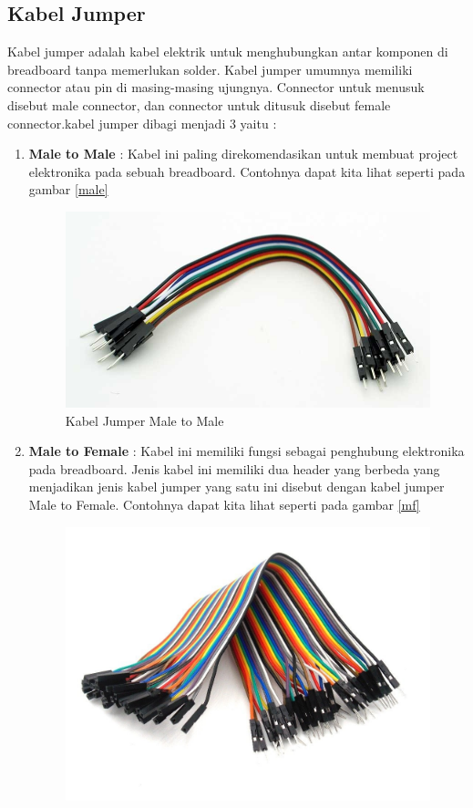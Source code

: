 \subsection{Kabel Jumper}
Kabel jumper adalah kabel elektrik untuk menghubungkan antar komponen di breadboard tanpa memerlukan solder. Kabel jumper umumnya memiliki connector atau pin di masing-masing ujungnya. Connector untuk menusuk disebut male connector, dan connector untuk ditusuk disebut female connector.kabel jumper dibagi menjadi 3 yaitu :
\begin{enumerate}
\item \textbf{Male to Male} : Kabel ini paling direkomendasikan untuk membuat project elektronika pada sebuah breadboard. Contohnya dapat kita lihat seperti pada gambar \ref{male} 
\begin{figure}[!htbp]
\centering
\includegraphics[width=.75\textwidth]{figures/CONV/male.jpg}
\caption{Kabel Jumper Male to Male}\label{fig:male}
\end{figure}
\item \textbf{Male to Female} : Kabel ini memiliki fungsi sebagai penghubung elektronika pada breadboard. Jenis kabel ini memiliki dua header yang berbeda yang menjadikan jenis kabel jumper yang satu ini disebut dengan kabel jumper Male to Female. Contohnya dapat kita lihat seperti pada gambar \ref{mf} 
\begin{figure}[!htbp]
\centering
\includegraphics[width=.75\textwidth]{figures/CONV/mf.jpg}

\end{figure}
\end{enumerate}
